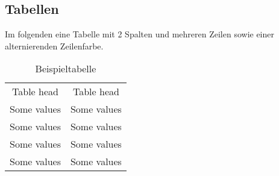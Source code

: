 \subsection{Tabellen}\label{subsec:tables}
	
Im folgenden eine Tabelle mit 2 Spalten und mehreren Zeilen sowie einer alternierenden Zeilenfarbe.
	
\begin{table}[H]
	\centering
	\caption{Beispieltabelle}
	\label{tab:test}
	\begin{tabular}{|c|c|}
    	\rowcolor{gray!50}
    	\hline
    	Table head & Table head\\
    	Some values & Some values\\
    	Some values & Some values\\
    	Some values & Some values\\
    	Some values & Some values\\
    	\hline
  	\end{tabular}
\end{table}